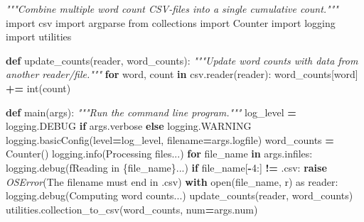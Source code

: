 \documentclass[
]{krantz}
\makeatletter
\newenvironment{Shaded}{\begin{snugshade}}{\end{snugshade}}
\newcommand{\BuiltInTok}[1]{#1}
\newcommand{\CommentTok}[1]{\textcolor[rgb]{0.56,0.35,0.01}{\textit{#1}}}
\newcommand{\ControlFlowTok}[1]{\textcolor[rgb]{0.13,0.29,0.53}{\textbf{#1}}}
\newcommand{\DecValTok}[1]{\textcolor[rgb]{0.00,0.00,0.81}{#1}}
\newcommand{\ImportTok}[1]{#1}
\newcommand{\KeywordTok}[1]{\textcolor[rgb]{0.13,0.29,0.53}{\textbf{#1}}}
\newcommand{\NormalTok}[1]{#1}
\newcommand{\OperatorTok}[1]{\textcolor[rgb]{0.81,0.36,0.00}{\textbf{#1}}}
\newcommand{\PreprocessorTok}[1]{\textcolor[rgb]{0.56,0.35,0.01}{\textit{#1}}}
\newcommand{\SpecialCharTok}[1]{\textcolor[rgb]{0.00,0.00,0.00}{#1}}
\newcommand{\SpecialStringTok}[1]{\textcolor[rgb]{0.31,0.60,0.02}{#1}}
\newcommand{\StringTok}[1]{\textcolor[rgb]{0.31,0.60,0.02}{#1}}
\newenvironment{kframe}{%
\medskip{}
\setlength{\fboxsep}{.8em}
 \def\at@end@of@kframe{}%
 \ifinner\ifhmode%
  \def\at@end@of@kframe{\end{minipage}}%
  \begin{minipage}{\columnwidth}%
 \fi\fi%
 \def\FrameCommand##1{\hskip\@totalleftmargin \hskip-\fboxsep
 \colorbox{shadecolor}{##1}\hskip-\fboxsep
     \hskip-\linewidth \hskip-\@totalleftmargin \hskip\columnwidth}%
 \MakeFramed {\advance\hsize-\width
   \@totalleftmargin\z@ \linewidth\hsize
   \@setminipage}}%
 {\par\unskip\endMakeFramed%
 \at@end@of@kframe}
\renewenvironment{Shaded}{\begin{kframe}}{\end{kframe}}
\makeatother
\begin{document}
\begin{Shaded}
\begin{Highlighting}[]
\CommentTok{"""Combine multiple word count CSV{-}files into a single cumulative count."""}
\ImportTok{import}\NormalTok{ csv}
\ImportTok{import}\NormalTok{ argparse}
\ImportTok{from}\NormalTok{ collections }\ImportTok{import}\NormalTok{ Counter}
\ImportTok{import}\NormalTok{ logging}
\ImportTok{import}\NormalTok{ utilities}


\KeywordTok{def}\NormalTok{ update\_counts(reader, word\_counts):}
    \CommentTok{"""Update word counts with data from another reader/file."""}
    \ControlFlowTok{for}\NormalTok{ word, count }\KeywordTok{in}\NormalTok{ csv.reader(reader):}
\NormalTok{        word\_counts[word] }\OperatorTok{+=} \BuiltInTok{int}\NormalTok{(count)}

\KeywordTok{def}\NormalTok{ main(args):}
    \CommentTok{"""Run the command line program."""}
\NormalTok{    log\_level }\OperatorTok{=}\NormalTok{ logging.DEBUG }\ControlFlowTok{if}\NormalTok{ args.verbose }\ControlFlowTok{else}\NormalTok{ logging.WARNING}
\NormalTok{    logging.basicConfig(level}\OperatorTok{=}\NormalTok{log\_level, filename}\OperatorTok{=}\NormalTok{args.logfile)}
\NormalTok{    word\_counts }\OperatorTok{=}\NormalTok{ Counter()}
\NormalTok{    logging.info(}\StringTok{\textquotesingle{}Processing files...\textquotesingle{}}\NormalTok{)}
    \ControlFlowTok{for}\NormalTok{ file\_name }\KeywordTok{in}\NormalTok{ args.infiles:}
\NormalTok{        logging.debug(}\SpecialStringTok{f\textquotesingle{}Reading in }\SpecialCharTok{\{}\NormalTok{file\_name}\SpecialCharTok{\}}\SpecialStringTok{...\textquotesingle{}}\NormalTok{)}
        \ControlFlowTok{if}\NormalTok{ file\_name[}\OperatorTok{{-}}\DecValTok{4}\NormalTok{:] }\OperatorTok{!=} \StringTok{\textquotesingle{}.csv\textquotesingle{}}\NormalTok{:}
            \ControlFlowTok{raise} \PreprocessorTok{OSError}\NormalTok{(}\StringTok{\textquotesingle{}The filename must end in \textasciigrave{}.csv\textasciigrave{}\textquotesingle{}}\NormalTok{)}
        \ControlFlowTok{with} \BuiltInTok{open}\NormalTok{(file\_name, }\StringTok{\textquotesingle{}r\textquotesingle{}}\NormalTok{) }\ImportTok{as}\NormalTok{ reader:}
\NormalTok{            logging.debug(}\StringTok{\textquotesingle{}Computing word counts...\textquotesingle{}}\NormalTok{)}
\NormalTok{            update\_counts(reader, word\_counts)}
\NormalTok{    utilities.collection\_to\_csv(word\_counts, num}\OperatorTok{=}\NormalTok{args.num)}


\end{Highlighting}
\end{Shaded}
\end{document}

